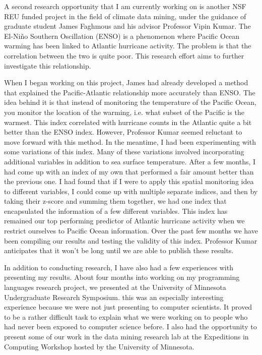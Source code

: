 \documentclass[a4paper,12pt]{article}
\begin{document}
A second research opportunity that I am currently working on is another NSF REU funded project in the field of climate data mining, under the guidance of graduate student James Faghmous and his advisor Professor Vipin Kumar.  The El-Ni\~{n}o Southern Oscillation (ENSO) is a phenomenon where Pacific Ocean warming has been linked to Atlantic hurricane activity\cite{enso}.  The problem is that the correlation between the two is quite poor.  This research effort aims to further investigate this relationship. 

When I began working on this project, James had already developed a method that explained the Pacific-Atlantic relationship more accurately than ENSO.  The idea behind it is that instead of monitoring the temperature of the Pacific Ocean, you monitor the location of the warming, i.e. what subset of the Pacific is the warmest.  This index correlated with hurricane counts in the Atlantic quite a bit better than the ENSO index.  However, Professor Kumar seemed reluctant to move forward with this method.  In the meantime, I had been experimenting with some variations of this index.  Many of these variations involved incorporating additional variables in addition to sea surface temperature.  After a few months, I had come up with an index of my own that performed a fair amount better than the previous one.  I had found that if I were to apply this spatial monitoring idea to different variables, I could come up with multiple separate indices, and then by taking their z-score and summing them together, we had one index that encapsulated the information of a few different variables.  This index has remained our top performing predictor of Atlantic hurricane activity when we restrict ourselves to Pacific Ocean information.  Over the past few months we have been compiling our results and testing the validity of this index.  Professor Kumar anticipates that it won't be long until we are able to publish these results.

In addition to conducting research, I have also had a few experiences with presenting my results.  About four months into working on my programming languages research project, we presented at the University of Minnesota Undergraduate Research Symposium.  this was an especially interesting experience because we were not just presenting to computer scientists.  It proved to be a rather difficult task to explain what we were working on to people who had never been exposed to computer science before. I also had the opportunity to present some of our work in the data mining research lab at the Expeditions in Computing Workshop hosted by the University of Minnesota. 
\end{document}
